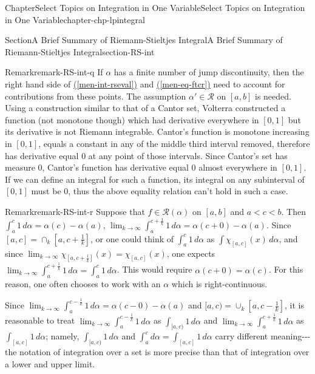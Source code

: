 \documentclass[oneside,10pt,]{book}
\newcommand{\xreffont}{\relax}
\numberwithin{equation}{section}
\newcommand{\cR}{\mathcal{R}}
\begin{document}
\begin{chapterptx}{Chapter}{Select Topics on Integration in One Variable}{}{Select Topics on Integration in One Variable}{}{}{chapter-chp-lpintegral}
\begin{sectionptx}{Section}{A Brief Summary of Riemann-Stieltjes Integral}{}{A Brief Summary of Riemann-Stieltjes Integral}{}{}{section-RS-int}
\begin{remark}{Remark}{}{remark-RS-int-q}
If \(\alpha\) has a finite number of jump discontinuity, then the right hand side of \hyperref[men-int-rseval]{({\xreffont\ref{men-int-rseval}})} and \hyperref[men-eq-ftcr]{({\xreffont\ref{men-eq-ftcr}})} need to account for contributions from these points. The assumption \(\alpha' \in \cR\) on \([a, b]\) is needed. Using a construction similar to that of a Cantor set, Volterra constructed a function (not monotone though) which had derivative everywhere in \([0, 1]\) but its derivative is not Riemann integrable. Cantor's function is monotone increasing in \([0, 1]\), equals a constant in any of the middle third interval removed, therefore has derivative equal \(0\) at any point of those intervals. Since Cantor's set has measure \(0\), Cantor's function has derivative equal \(0\) almost everywhere in \([0, 1]\). If we can define an integral for such a function, its integral on any subinterval of \([0, 1]\) must be \(0\), thus the above equality relation can't hold in such a case.%
\end{remark}
\begin{remark}{Remark}{}{remark-RS-int-r}%
Suppose that \(f\in \cR(\alpha)\) on \([a, b]\) and \(a < c < b\). Then \(\int_{a}^{c}1\, d \alpha=\alpha(c)-\alpha(a)\), \(\lim_{k\to\infty} \int_{a}^{c+ \frac 1k}1\, d \alpha=\alpha(c+0)-\alpha(a)\). Since \([a, c]=\cap_{k}[a, c+ \frac 1k]\), or one could think of \(\int_{a}^{c}1\, d \alpha\) as \(\int \chi_{[a, c]} (x)\, d\alpha\), and since \(\lim_{k\to\infty} \chi_{[a, c+\frac 1k]} (x)=\chi_{[a, c]} (x)\), one expects \(\lim_{k\to\infty} \int_{a}^{c+ \frac 1k}1\, d \alpha= \int_{a}^{c}1\, d \alpha\). This would require \(\alpha(c+0)=\alpha(c)\). For this reason, one often chooses to work with an \(\alpha\) which is right-continuous.%
\par
Since \(\lim_{k\to\infty} \int_{a}^{c- \frac 1k}1\, d \alpha=\alpha(c-0)-\alpha(a)\) and \([a, c)=\cup_{k}[a, c- \frac 1k]\), it is reasonable to treat \(\lim_{k\to\infty} \int_{a}^{c- \frac 1k}1\, d \alpha\) as \(\int_{[a, c)} 1\, d\alpha\) and \(\lim_{k\to\infty} \int_{a}^{c+ \frac 1k}1\, d \alpha\) as \(\int_{[a, c]} 1\, d\alpha\); namely, \(\int_{[a, c)} 1\, d\alpha\) and \(\int_{a}^{c} d\alpha =\int_{[a, c]} 1\, d\alpha\) carry different meaning-{}-{}- the notation of integration over a set is more precise than that of integration over a lower and upper limit.%
\end{remark}
\end{sectionptx}
%
%
\typeout{************************************************}

\end{chapterptx}
\end{document}
